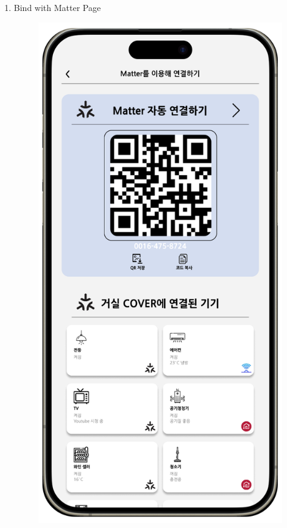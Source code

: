 \documentclass[conference]{IEEEtran}
\begin{document}
\begin{enumerate}[label=\arabic*.]
\item Bind with Matter Page\\
\begin{figure}[H]\centering \includegraphics[scale=0.4]{images/sw-spec-9.png}\end{figure}

\end{enumerate}
\end{document}
